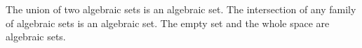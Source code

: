 The union of two algebraic sets is an algebraic set. The intersection of any family of algebraic sets is an algebraic set. The empty set and the whole space are algebraic sets.

